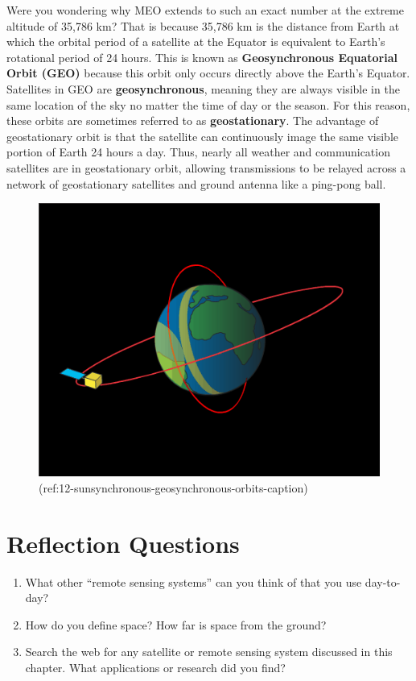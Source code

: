 \documentclass[
]{book}
\providecommand{\tightlist}{%
  \setlength{\itemsep}{0pt}\setlength{\parskip}{0pt}}
\begin{document}
Were you wondering why MEO extends to such an exact number at the extreme altitude of 35,786 km? That is because 35,786 km is the distance from Earth at which the orbital period of a satellite at the Equator is equivalent to Earth's rotational period of 24 hours. This is known as \textbf{Geosynchronous Equatorial Orbit (GEO)} because this orbit only occurs directly above the Earth's Equator. Satellites in GEO are \textbf{geosynchronous}, meaning they are always visible in the same location of the sky no matter the time of day or the season. For this reason, these orbits are sometimes referred to as \textbf{geostationary}. The advantage of geostationary orbit is that the satellite can continuously image the same visible portion of Earth 24 hours a day. Thus, nearly all weather and communication satellites are in geostationary orbit, allowing transmissions to be relayed across a network of geostationary satellites and ground antenna like a ping-pong ball.



\begin{figure}
\includegraphics[width=0.75\linewidth]{images/12-sunsynchronous-geosynchronous-orbits-static} \caption{(ref:12-sunsynchronous-geosynchronous-orbits-caption)}\label{fig:12-sunsynchronous-geosynchronous-orbits}
\end{figure}

\section*{Reflection Questions}\label{reflection-questions-7}

\begin{enumerate}
\def\labelenumi{\arabic{enumi}.}
\tightlist
\item
  What other ``remote sensing systems'' can you think of that you use day-to-day?
\item
  How do you define space? How far is space from the ground?
\item
  Search the web for any satellite or remote sensing system discussed in this chapter. What applications or research did you find?
\end{enumerate}
\end{document}
